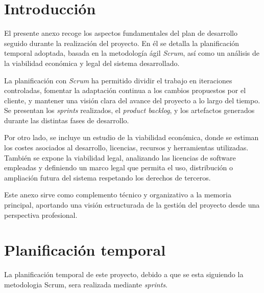 
\section{Introducción}
El presente anexo recoge los aspectos fundamentales del plan de desarrollo seguido durante la realización del proyecto. En él se detalla la planificación temporal adoptada, basada en la metodología ágil \textit{Scrum}, así como un análisis de la viabilidad económica y legal del sistema desarrollado.

La planificación con \textit{Scrum} ha permitido dividir el trabajo en iteraciones controladas, fomentar la adaptación continua a los cambios propuestos por el cliente, y mantener una visión clara del avance del proyecto a lo largo del tiempo. Se presentan los \textit{sprints} realizados, el \textit{product backlog}, y los artefactos generados durante las distintas fases de desarrollo.

Por otro lado, se incluye un estudio de la viabilidad económica, donde se estiman los costes asociados al desarrollo, licencias, recursos y herramientas utilizadas. También se expone la viabilidad legal, analizando las licencias de software empleadas y definiendo un marco legal que permita el uso, distribución o ampliación futura del sistema respetando los derechos de terceros.

Este anexo sirve como complemento técnico y organizativo a la memoria principal, aportando una visión estructurada de la gestión del proyecto desde una perspectiva profesional.

\section{Planificación temporal}
La planificación temporal de este proyecto, debido a que se esta siguiendo la metodologia Scrum, sera realizada mediante \textit{sprints}.

